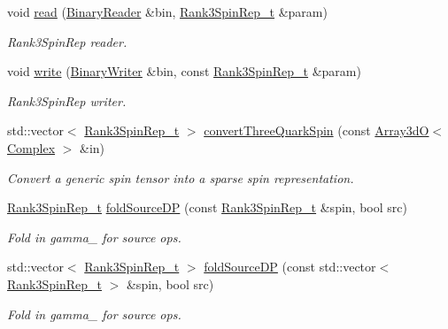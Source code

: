 \begin{DoxyCompactItemize}
void \mbox{\hyperlink{namespaceHadron_aa7d26a465958f014ffb6f4cb4d45a389}{read}} (\mbox{\hyperlink{classADATIO_1_1BinaryReader}{Binary\+Reader}} \&bin, \mbox{\hyperlink{structHadron_1_1Rank3SpinRep__t}{Rank3\+Spin\+Rep\+\_\+t}} \&param)
\begin{DoxyCompactList}\small\item\em Rank3\+Spin\+Rep reader. \end{DoxyCompactList}\item 
void \mbox{\hyperlink{namespaceHadron_ae2b761452803d14604c4471a4cf35ca3}{write}} (\mbox{\hyperlink{classADATIO_1_1BinaryWriter}{Binary\+Writer}} \&bin, const \mbox{\hyperlink{structHadron_1_1Rank3SpinRep__t}{Rank3\+Spin\+Rep\+\_\+t}} \&param)
\begin{DoxyCompactList}\small\item\em Rank3\+Spin\+Rep writer. \end{DoxyCompactList}\item 
std\+::vector$<$ \mbox{\hyperlink{structHadron_1_1Rank3SpinRep__t}{Rank3\+Spin\+Rep\+\_\+t}} $>$ \mbox{\hyperlink{namespaceHadron_abbb775633773ccb52dcaef4974305df9}{convert\+Three\+Quark\+Spin}} (const \mbox{\hyperlink{classADAT_1_1Array3dO}{Array3dO}}$<$ \mbox{\hyperlink{group__defs_gabaa4aa11d5212d34042d08bf0b2f9cc0}{Complex}} $>$ \&in)
\begin{DoxyCompactList}\small\item\em Convert a generic spin tensor into a sparse spin representation. \end{DoxyCompactList}\item 
\mbox{\hyperlink{structHadron_1_1Rank3SpinRep__t}{Rank3\+Spin\+Rep\+\_\+t}} \mbox{\hyperlink{namespaceHadron_a9a1884dbfb0a2eb11bd7d4e6585e6966}{fold\+Source\+DP}} (const \mbox{\hyperlink{structHadron_1_1Rank3SpinRep__t}{Rank3\+Spin\+Rep\+\_\+t}} \&spin, bool src)
\begin{DoxyCompactList}\small\item\em Fold in gamma\+\_ for source ops. \end{DoxyCompactList}\item 
std\+::vector$<$ \mbox{\hyperlink{structHadron_1_1Rank3SpinRep__t}{Rank3\+Spin\+Rep\+\_\+t}} $>$ \mbox{\hyperlink{namespaceHadron_a121d64f8eb61ea3fc51116de1c659ee5}{fold\+Source\+DP}} (const std\+::vector$<$ \mbox{\hyperlink{structHadron_1_1Rank3SpinRep__t}{Rank3\+Spin\+Rep\+\_\+t}} $>$ \&spin, bool src)
\begin{DoxyCompactList}\small\item\em Fold in gamma\+\_ for source ops. \end{DoxyCompactList}\item 

\end{DoxyCompactItemize}
